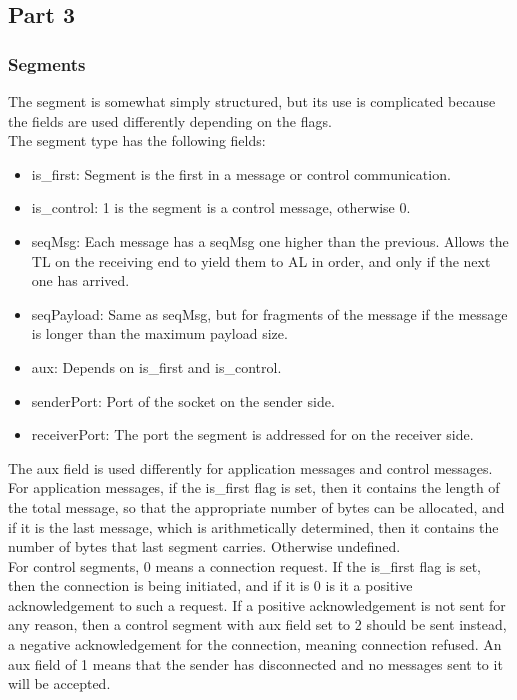 \subsection{Part 3}
\subsubsection{Segments}
The segment is somewhat simply structured, but its use is complicated because the fields are used differently depending on the flags.\\
The segment type has the following fields:
\begin{itemize}
\item is\_first: Segment is the first in a message or control communication.
\item is\_control: 1 is the segment is a control message, otherwise 0.
\item seqMsg: Each message has a seqMsg one higher than the previous. Allows the TL on the receiving end to yield them to AL in order, and only if the next one has arrived.
\item seqPayload: Same as seqMsg, but for fragments of the message if the message is longer than the maximum payload size.
\item aux: Depends on is\_first and is\_control.
\item senderPort: Port of the socket on the sender side.
\item receiverPort: The port the segment is addressed for on the receiver side.
\end{itemize}

The aux field is used differently for application messages and control messages. For application messages, if the is\_first flag is set, then it contains the length of the total message, so that the appropriate number of bytes can be allocated, and if it is the last message, which is arithmetically determined, then it contains the number of bytes that last segment carries. Otherwise undefined.\\
For control segments, 0 means a connection request. If the is\_first flag is set, then the connection is being initiated, and if it is 0 is it a positive acknowledgement to such a request. If a positive acknowledgement is not sent for any reason, then a control segment with aux field set to 2 should be sent instead, a negative acknowledgement for the connection, meaning connection refused. An aux field of 1 means that the sender has disconnected and no messages sent to it will be accepted.

